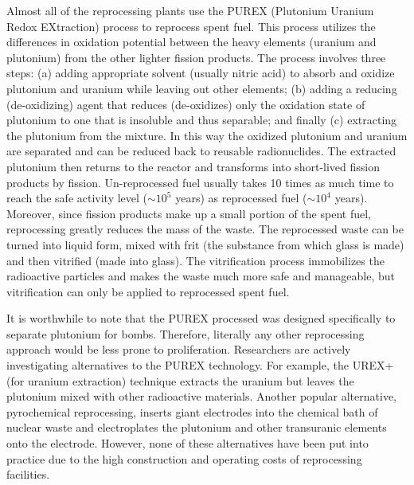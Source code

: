 \documentclass[nofootinbib,preprint,aip,pra]{revtex4-1}
\newcommand{\red}[1]{\textcolor{red}{\bf #1}}
\begin{document}
    Almost all of the reprocessing plants use the PUREX (Plutonium Uranium Redox EXtraction) process
    to reprocess spent fuel. This process utilizes the differences in oxidation potential 
    between the heavy elements (uranium and plutonium) from the other lighter fission products.
    The process involves three steps: (a) adding appropriate solvent (usually nitric acid) to absorb and oxidize 
    plutonium and uranium while leaving out other elements;
    (b) adding a reducing (de-oxidizing) agent that reduces (de-oxidizes) only the
    oxidation state of plutonium to one that is insoluble
    and thus separable; and finally (c) extracting the plutonium from the mixture. In this way
    the oxidized plutonium and uranium are separated and can be reduced back to reusable radionuclides.\cite{lb01} 
    The extracted plutonium then returns to the reactor and transforms into short-lived fission products
    by fission. Un-reprocessed fuel usually takes 10 times as much time to reach the safe
    activity level ($\sim 10^5$ years) as reprocessed fuel ($\sim 10^4$ years). Moreover, since fission products
    make up a small portion of the spent fuel, reprocessing greatly reduces the mass of the waste. The reprocessed
    waste can be turned into liquid form, mixed with frit (the substance from which glass is made) and then
    vitrified (made into glass). The vitrification process immobilizes the radioactive particles and makes
    the waste much more safe and manageable, but vitrification can only be applied to reprocessed spent fuel.

    It is worthwhile to note that the PUREX processed was designed specifically to separate plutonium for
    bombs. Therefore, literally any other reprocessing approach would be less prone to proliferation.
    Researchers are actively investigating alternatives to the PUREX technology. For example, the UREX+ (for
    uranium extraction) technique extracts the uranium but leaves the plutonium mixed with other
    radioactive materials. Another popular alternative, pyrochemical reprocessing, inserts giant electrodes
    into the chemical bath of nuclear waste and electroplates the plutonium and other transuranic elements onto
    the electrode. However, none of these alternatives have been put into practice due to the high construction
    and operating costs of reprocessing facilities.\cite{aa12}

\end{document}
